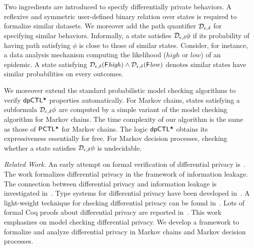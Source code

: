 
Two ingredients are introduced to specify differentially private
behaviors. A reflexive and symmetric user-defined binary relation
over states is required to formalize similar datasets. We moreover add
the path quantifier $\mathcal{D}_{{\epsilon}, {\delta}}$ for specifying similar
behaviors. Informally, a state satisfies $\mathcal{D}_{{\epsilon}, {\delta}}
\phi$ if its probability of having path satisfying $\phi$ is close to
those of similar states. Consider, for instance, a data analysis
mechanism computing the likelihood ($\mathit{high}$ or $\mathit{low}$)
of an epidemic. A state satisfying
$\mathcal{D}_{{\epsilon}, {\delta}} (\mathsf{F} \mathit{high}) \wedge
\mathcal{D}_{{\epsilon}, {\delta}} (\mathsf{F} \mathit{low})$ denotes similar states
have similar probabilities on every outcomes.



We moreover extend the standard probabilistic model checking
algorithms to verify $\textsf{dpCTL*}$ properties automatically. For Markov
chains, states
satisfying a subformula $\mathcal{D}_{{\epsilon}, {\delta}} \phi$ are computed
by a simple variant of the model checking algorithm for Markov chains.
The time complexity of our algorithm is the same as
those of $\textsf{PCTL*}$ for Markov chains. The logic $\textsf{dpCTL*}$ obtains its
expressiveness essentially for free.
For Markov decision processes, checking whether a state
satisfies $\mathcal{D}_{{\epsilon}, {\delta}} \phi$ is undecidable.


\noindent
\emph{Related Work.}
An early attempt on formal verification of differential privacy
is~\cite{TKD:11:FVDPIS}. The work formalizes differential privacy in
the framework of information leakage. The connection between
differential privacy and information leakage is investigated
in~\cite{AACDP:15:OILDPM,GMP:16:PDPFPS}. Type systems for differential
privacy have been developed
in~\cite{WHRP:17:FADP,GHHNP:13:LDPDP,RP:10:DMTGS}. A light-weight
technique for checking differential privacy can be found
in~\cite{ZK:17:LTADPP}. Lots of formal Coq proofs about differential
privacy are reported
in~\cite{BFGGHS:16:APCDP,BGGHS:16:PDPPC,BKOB:12:PRRDP,BDGKZ:13:VCDPASM,BGAHKS:14:PDPHL,BGAHRS:15:HOARRT,BFGAGHS:16:DPBP}. This
work emphasizes on model checking differential privacy. We develop a
framework to formalize and analyze differential privacy in Markov
chains and Markov decision processes.

